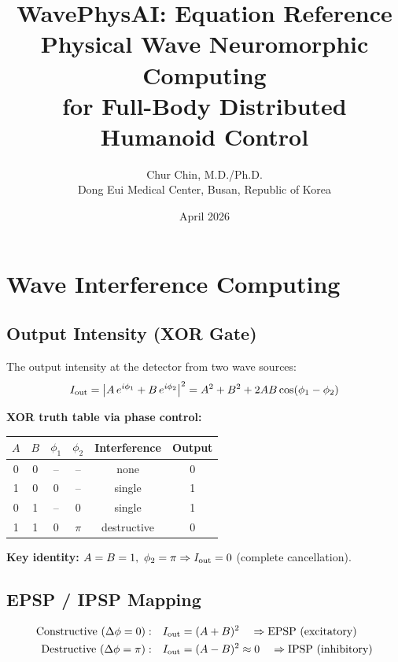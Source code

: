 \documentclass[12pt, a4paper]{article}
\title{\textbf{WavePhysAI: Equation Reference}\\
       \large Physical Wave Neuromorphic Computing\\
       for Full-Body Distributed Humanoid Control}
\author{Chur Chin, M.D./Ph.D.\\
        \small Dong Eui Medical Center, Busan, Republic of Korea}
\date{April 2026}
\begin{document}
\maketitle
\tableofcontents
\newpage

\section{Wave Interference Computing}

\subsection{Output Intensity (XOR Gate)}

The output intensity at the detector from two wave sources:
\begin{equation}\label{eq:interference}
  I_{\rm out} = \left| A\,e^{i\phi_1} + B\,e^{i\phi_2} \right|^2
  = A^2 + B^2 + 2AB\cos(\phi_1 - \phi_2)
\end{equation}

\textbf{XOR truth table via phase control:}
\begin{center}
\begin{tabular}{cccccc}
\toprule
$A$ & $B$ & $\phi_1$ & $\phi_2$ & Interference & Output \\
\midrule
0 & 0 & -- & -- & none & 0 \\
1 & 0 & 0 & -- & single & 1 \\
0 & 1 & -- & 0 & single & 1 \\
1 & 1 & 0 & $\pi$ & destructive & 0 \\
\bottomrule
\end{tabular}
\end{center}

\textbf{Key identity:} $A = B = 1,\ \phi_2 = \pi \Rightarrow I_{\rm out} = 0$ (complete cancellation).

\subsection{EPSP / IPSP Mapping}

\begin{align}
  \text{Constructive}\ (\Delta\phi = 0):&\quad
    I_{\rm out} = (A+B)^2 \quad \Rightarrow \text{EPSP (excitatory)} \label{eq:epsp}\\
  \text{Destructive}\ (\Delta\phi = \pi):&\quad
    I_{\rm out} = (A-B)^2 \approx 0 \quad \Rightarrow \text{IPSP (inhibitory)} \label{eq:ipsp}
\end{align}
\end{document}
